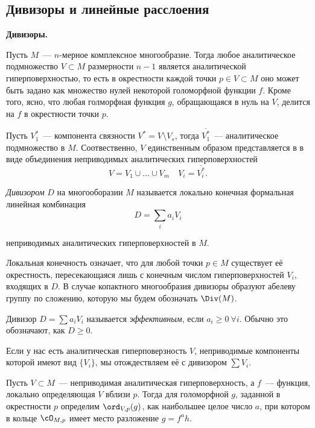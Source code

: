 
	\subsection{Дивизоры и линейные расслоения}

	\noindent\bf{Дивизоры.}

	Пусть $M$~--- $n$-мерное комплексное многообразие. Тогда любое аналитическое подмножество $V \subset M$ размерности $n - 1$ является аналитической гиперповерхностью, то есть в окрестности каждой точки $p \in V \subset M$ оно может быть задано как множество нулей  некоторой голоморфной функции $f$. Кроме того, ясно, что любая голморфная функция $g$, обращающаяся в нуль на $V$, делится на $f$ в окрестности точки $p$. 

	Пусть $V_1^*$~--- компонента связности $V^* = V \setminus V_s$, тогда $\overline{V_1^*}$~--- аналитическое подмножество в $M$. Соотвественно, $V$ единственным образом представляется в в виде объединения неприводимых аналитических гиперповерхностей 
	\[
		V = V_1 \cup \ldots \cup V_m \quad V_i = \overline{V_i^*}. 
	\]

	\begin{definition} 
		\emph{Дивизором} $D$ на многооборазии $M$ называется локально конечная формальная линейная комбинация  
		\[
			D = \sum_{i} a_i V_i
		\]

		неприводимых аналитических гиперповерхностей в $M$. 
	\end{definition}

	\begin{remark}
		Локальная конечность означает, что для любой точки $p \in M$ существует её окрестность, пересекающаяся лишь с конечным числом гиперповерхностей $V_i$, входящих в $D$. В случае копактного многообразия дивизоры образуют абелеву группу по сложению, которую мы будем обозначать $\Div(M)$.
	\end{remark}

	\begin{definition} 
		Дивизор $D = \sum a_i V_i$ называется \emph{эффективным}, если $a_i \ge 0 \ \forall i$. Обычно это обозначают, как $D \ge 0$. 
	\end{definition}

	\begin{remark}
		Если у нас есть аналитическая гиперповерзность $V$, неприводимые компоненты которой имеют вид $\{ V_i \}$, мы отождествляем её с дивизором $\sum V_i$. 
	\end{remark}

	\begin{definition} 
		Пусть $V \subset M$~--- неприводимая аналитическая гиперповерхность, а $f$~--- функция, локально определяющая $V$ вблизи $p$. Тогда для голоморфной $g$, заданной в окрестности $p$ определим $\ord_{V, p}(g)$, как наибольшее целое число $a$, при котором в кольце $\cO_{M, p}$  имеет место разложение $g = f^a h$.
	\end{definition}

